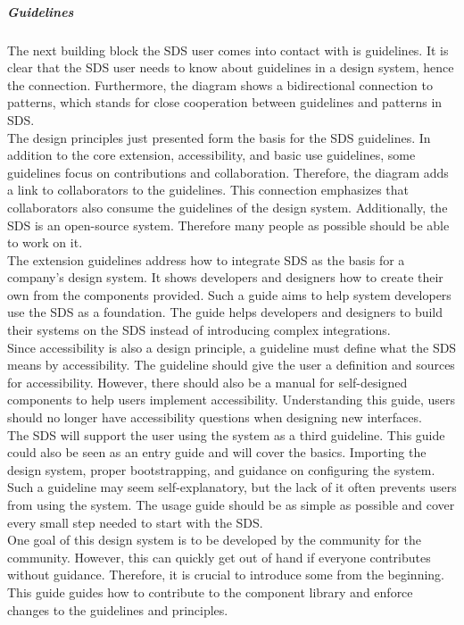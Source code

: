 \subparagraph{Guidelines}
The next building block the SDS user comes into contact with is guidelines. It is clear that the \ac{SDS} user needs to know about guidelines in a design system, hence the connection. Furthermore, the diagram shows a bidirectional connection to patterns, which stands for close cooperation between guidelines and patterns in \ac{SDS}.\\
The design principles just presented form the basis for the \ac{SDS} guidelines. In addition to the core extension, accessibility, and basic use guidelines, some guidelines focus on contributions and collaboration. Therefore, the diagram adds a link to collaborators to the guidelines. This connection emphasizes that collaborators also consume the guidelines of the design system. Additionally, the \ac{SDS} is an open-source system. Therefore many people as possible should be able to work on it.  \\
The extension guidelines address how to integrate \ac{SDS} as the basis for a company's design system. It shows developers and designers how to create their own from the components provided. Such a guide aims to help system developers use the \ac{SDS} as a foundation. The guide helps developers and designers to build their systems on the \ac{SDS} instead of introducing complex integrations. \\
Since accessibility is also a design principle, a guideline must define what the \ac{SDS} means by accessibility. The guideline should give the user a definition and sources for accessibility. However, there should also be a manual for self-designed components to help users implement accessibility. Understanding this guide, users should no longer have accessibility questions when designing new interfaces. \\
The \ac{SDS} will support the user using the system as a third guideline. This guide could also be seen as an entry guide and will cover the basics. Importing the design system, proper bootstrapping, and guidance on configuring the system. Such a guideline may seem self-explanatory, but the lack of it often prevents users from using the system. The usage guide should be as simple as possible and cover every small step needed to start with the \ac{SDS}. \\
One goal of this design system is to be developed by the community for the community. However, this can quickly get out of hand if everyone contributes without guidance. Therefore, it is crucial to introduce some from the beginning. This guide guides how to contribute to the component library and enforce changes to the guidelines and principles. \\
